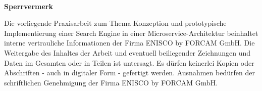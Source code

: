 
~

\vspace{17.1mm}

\begin{flushleft}
    \textbf{\huge{}Sperrvermerk}{\huge\par}
\par\end{flushleft}
Die vorliegende Praxisarbeit zum Thema \glqq Konzeption und prototypische Implementierung einer Search Engine in einer Microservice-Architektur\grqq{} beinhaltet interne vertrauliche Informationen der Firma ENISCO by FORCAM GmbH. Die Weitergabe des Inhaltes der Arbeit und eventuell beiliegender Zeichnungen und Daten im Gesamten oder in Teilen ist untersagt. Es dürfen keinerlei Kopien oder Abschriften - auch in digitaler Form - gefertigt werden. Ausnahmen bedürfen der schriftlichen Genehmigung der Firma ENISCO by FORCAM GmbH.